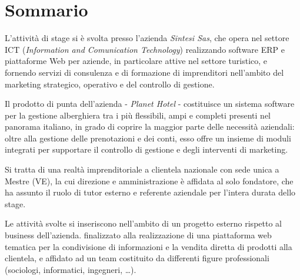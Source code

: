 \begingroup
\let\clearpage\relax
\let\cleardoublepage\relax
\let\cleardoublepage\relax

\chapter*{Sommario}
	L'attività di stage si è svolta presso l'azienda \textit{Sintesi Sas}, che opera nel settore ICT (\textit{Information and Comunication Technology}) realizzando software ERP e piattaforme Web per aziende, in particolare attive nel settore turistico, e fornendo servizi di consulenza e di formazione di imprenditori nell'ambito del marketing strategico, operativo e del controllo di gestione.
	
	Il prodotto di punta dell'azienda - \textit{Planet Hotel} - costituisce un sistema software per la gestione alberghiera tra i più flessibili, ampi e completi presenti nel panorama italiano, in grado di coprire la maggior parte delle necessità aziendali: oltre alla gestione delle prenotazioni e dei conti, esso offre un insieme di moduli integrati per supportare il controllo di gestione e degli interventi di marketing.

	Si tratta di una realtà imprenditoriale a clientela nazionale con sede unica a Mestre (VE), la cui direzione e amministrazione è affidata al solo fondatore, che ha assunto il ruolo di tutor esterno e referente aziendale per l'intera durata dello stage.

	Le attività svolte si inseriscono nell'ambito di un progetto esterno rispetto al business dell'azienda. finalizzato alla realizzazione di una piattaforma web tematica per la condivisione di informazioni e la vendita diretta di prodotti alla clientela, e affidato ad un team costituito da differenti figure professionali (sociologi, informatici, ingegneri, \ldots).
	
